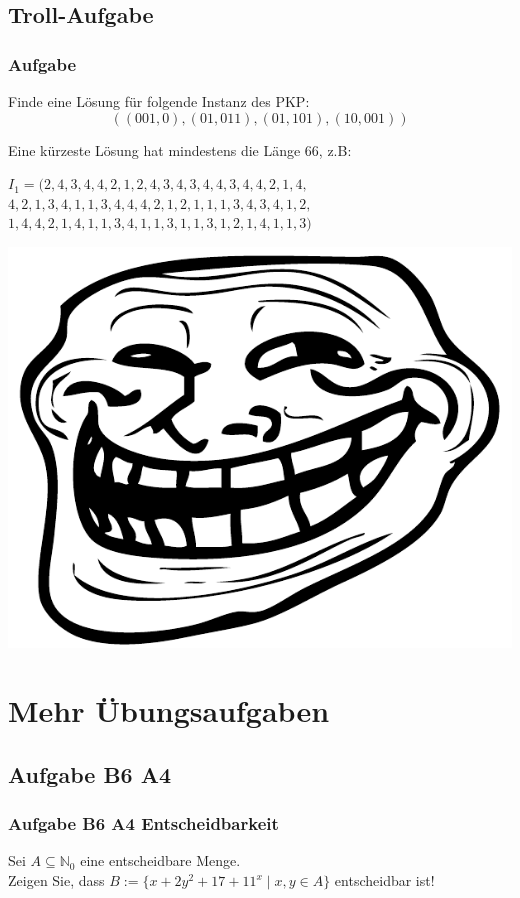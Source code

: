\subsection{Troll-Aufgabe}
\begin{frame}
\frametitle{Aufgabe}
Finde eine Lösung für folgende Instanz des PKP:
$$ ((001,0),(01,011),(01,101),(10,001)) $$

\invincible
\pause

Eine kürzeste Lösung hat mindestens die Länge 66, z.B:
\begin{center}
$ I_1 = (2, 4, 3, 4, 4, 2, 1, 2, 4, 3, 4, 3, 4, 4, 3, 4, 4, 2, 1, 4,$ \\
$4, 2, 1, 3, 4, 1, 1, 3, 4, 4, 4, 2, 1, 2, 1, 1, 1, 3, 4, 3, 4, 1, 2,$ \\
$1, 4, 4, 2, 1, 4, 1, 1, 3, 4, 1, 1, 3, 1, 1, 3, 1, 2, 1, 4, 1, 1, 3)$
\end{center}

\pause

\includegraphics{images/trollface}

\vincible

\end{frame}

\section{Mehr Übungsaufgaben}
\subsection{Aufgabe B6 A4}
\begin{frame}
	\frametitle{Aufgabe B6 A4 Entscheidbarkeit}
	Sei $A \subseteq \mathbb{N}_0$ eine entscheidbare Menge. \\
	Zeigen Sie, dass $ B := \{x+2y^2+17+11^x \; | \; x,y \in A\}$ entscheidbar ist!
\end{frame}
